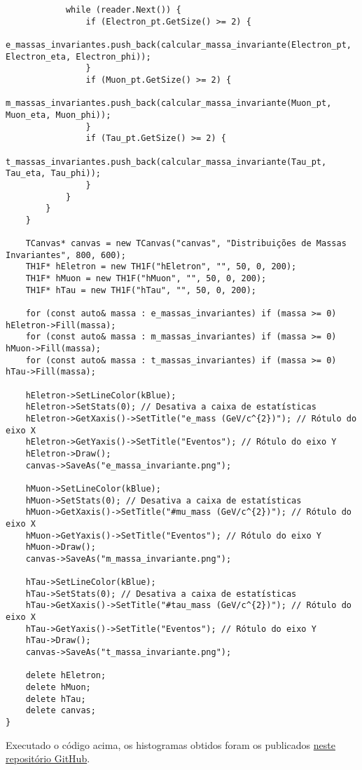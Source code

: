 \documentclass[a4 paper]{article}
\numberwithin{equation}{section}
\newcommand{\0}{\mathbf{0}}
\begin{document}
\begin{lstlisting}
            while (reader.Next()) {
                if (Electron_pt.GetSize() >= 2) {
                    e_massas_invariantes.push_back(calcular_massa_invariante(Electron_pt, Electron_eta, Electron_phi));
                }
                if (Muon_pt.GetSize() >= 2) {
                    m_massas_invariantes.push_back(calcular_massa_invariante(Muon_pt, Muon_eta, Muon_phi));
                }
                if (Tau_pt.GetSize() >= 2) {
                    t_massas_invariantes.push_back(calcular_massa_invariante(Tau_pt, Tau_eta, Tau_phi));
                }
            }
        }
    }

    TCanvas* canvas = new TCanvas("canvas", "Distribuições de Massas Invariantes", 800, 600);
    TH1F* hEletron = new TH1F("hEletron", "", 50, 0, 200);
    TH1F* hMuon = new TH1F("hMuon", "", 50, 0, 200);
    TH1F* hTau = new TH1F("hTau", "", 50, 0, 200);

    for (const auto& massa : e_massas_invariantes) if (massa >= 0) hEletron->Fill(massa);
    for (const auto& massa : m_massas_invariantes) if (massa >= 0) hMuon->Fill(massa);
    for (const auto& massa : t_massas_invariantes) if (massa >= 0) hTau->Fill(massa);

    hEletron->SetLineColor(kBlue);
    hEletron->SetStats(0); // Desativa a caixa de estatísticas
    hEletron->GetXaxis()->SetTitle("e_mass (GeV/c^{2})"); // Rótulo do eixo X
    hEletron->GetYaxis()->SetTitle("Eventos"); // Rótulo do eixo Y
    hEletron->Draw();
    canvas->SaveAs("e_massa_invariante.png");

    hMuon->SetLineColor(kBlue);
    hMuon->SetStats(0); // Desativa a caixa de estatísticas
    hMuon->GetXaxis()->SetTitle("#mu_mass (GeV/c^{2})"); // Rótulo do eixo X
    hMuon->GetYaxis()->SetTitle("Eventos"); // Rótulo do eixo Y
    hMuon->Draw();
    canvas->SaveAs("m_massa_invariante.png");

    hTau->SetLineColor(kBlue);
    hTau->SetStats(0); // Desativa a caixa de estatísticas
    hTau->GetXaxis()->SetTitle("#tau_mass (GeV/c^{2})"); // Rótulo do eixo X
    hTau->GetYaxis()->SetTitle("Eventos"); // Rótulo do eixo Y
    hTau->Draw();
    canvas->SaveAs("t_massa_invariante.png");

    delete hEletron;
    delete hMuon;
    delete hTau;
    delete canvas;
}

\end{lstlisting}

Executado o código acima, os histogramas obtidos foram os publicados \href{https://github.com/DiogoCaffonso/FAE_Repo/tree/master/Trabalho5/exercicio/Images/SegundoPasso}{neste repositório GitHub}.
\end{document}
